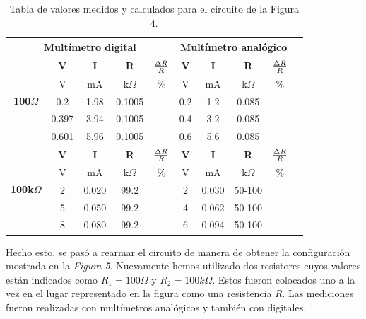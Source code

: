 \documentclass{article}
\begin{document}
\begin{table}[!hbt]
	\begin{center}

		\begin{tabular}{|c|c|c|c|c|c|c|c|c|c|} \hline
			\multicolumn{5}{|c|}{\textbf{Multímetro digital}} & \multicolumn{4}{|c|}{\textbf{Multímetro analógico}} \\ \hline
			\multirow{5}{*}{\textbf{100$\Omega$}} 
			& \textbf{V} & \textbf{I} & \textbf{R} & \textbf{${\Delta R \over R}$} & \textbf{V} & \textbf{I} & \textbf{R} & \textbf{${\Delta R \over R}$} \\\cline{2-9}
			& V & mA & k$\Omega$ & \% & V & mA & k$\Omega$ & \% \\\cline{2-9}
			& 0.2 & 1.98 & 0.1005 &  & 0.2 & 1.2 & 0.085 &  \\\cline{2-9}
			& 0.397 & 3.94 & 0.1005 &  & 0.4 & 3.2 & 0.085 &  \\\cline{2-9}
			& 0.601 & 5.96 & 0.1005 &  & 0.6 & 5.6 & 0.085 &  \\ \hline
			\multirow{5}{*}{\textbf{100k$\Omega$}} 
			& \textbf{V} & \textbf{I} & \textbf{R} & \textbf{${\Delta R \over R}$} & \textbf{V} & \textbf{I} & \textbf{R} & \textbf{${\Delta R \over R}$} \\\cline{2-9}
			& V & mA & k$\Omega$ & \% & V & mA & k$\Omega$ & \% \\\cline{2-9}
			& 2 & 0.020 & 99.2 &  & 2 & 0.030 & 50-100 &  \\\cline{2-9}
			& 5 & 0.050 & 99.2 &  & 4 & 0.062 & 50-100 &  \\\cline{2-9}
			& 8 & 0.080 & 99.2 &  & 6 & 0.094 & 50-100 &  \\ \hline
		\end{tabular}

	\caption{Tabla de valores medidos y calculados para el circuito de la Figura 4.}
	\end{center}
\end{table}
\bigskip



	Hecho esto, se pasó a rearmar el circuito de manera de obtener la configuración mostrada en la \textit{Figura 5}. Nuevamente hemos utilizado dos resistores cuyos valores están indicados como \textit{$R_1=100\Omega$} y \textit{$R_2=100k\Omega$}. Estos fueron colocados uno a la vez en el lugar representado en la figura como una resistencia \textit{R}. Las mediciones fueron realizadas con multímetros analógicos y también con digitales.
\bigskip
\end{document}
